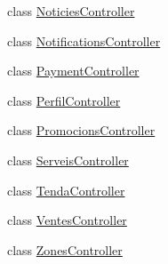 \begin{DoxyCompactItemize}
\item 
class \mbox{\hyperlink{class_app_1_1_http_1_1_controllers_1_1_noticies_controller}{Noticies\+Controller}}
\item 
class \mbox{\hyperlink{class_app_1_1_http_1_1_controllers_1_1_notifications_controller}{Notifications\+Controller}}
\item 
class \mbox{\hyperlink{class_app_1_1_http_1_1_controllers_1_1_payment_controller}{Payment\+Controller}}
\item 
class \mbox{\hyperlink{class_app_1_1_http_1_1_controllers_1_1_perfil_controller}{Perfil\+Controller}}
\item 
class \mbox{\hyperlink{class_app_1_1_http_1_1_controllers_1_1_promocions_controller}{Promocions\+Controller}}
\item 
class \mbox{\hyperlink{class_app_1_1_http_1_1_controllers_1_1_serveis_controller}{Serveis\+Controller}}
\item 
class \mbox{\hyperlink{class_app_1_1_http_1_1_controllers_1_1_tenda_controller}{Tenda\+Controller}}
\item 
class \mbox{\hyperlink{class_app_1_1_http_1_1_controllers_1_1_ventes_controller}{Ventes\+Controller}}
\item 
class \mbox{\hyperlink{class_app_1_1_http_1_1_controllers_1_1_zones_controller}{Zones\+Controller}}
\end{DoxyCompactItemize}
